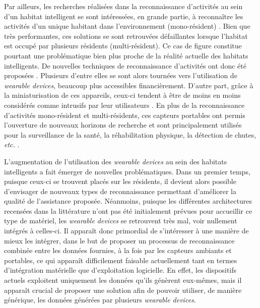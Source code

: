 {{Par ailleurs, les recherches réalisées dans la reconnaissance d'activités au sein d'un habitat intelligent se sont intéressées, en grande partie, à reconnaître les activités d'un unique habitant dans l'environnement (mono-résident) \cite{VikramadityaJakkula2007, VanKasteren2008, Inomata2009, Ghazvininejad2011, Belley2014, Fortin-Simard2015}. Bien que très performantes, ces solutions se sont retrouvées défaillantes lorsque l'habitat est occupé par plusieurs résidents (multi-résident). Ce cas de figure constitue pourtant une problématique bien plus proche de la réalité actuelle des habitats intelligents. De nouvelles techniques de reconnaissance d'activités ont donc été proposées \citep{Crandall2009, Cook2009, Alemdar2013, Ayuningtyas2014, Emi2015, Mokhtari2018}. Plusieurs d'entre elles \citep{Mihailidis2004, Tunca2014} se sont alors tournées vers l'utilisation de \textit{wearable devices}, beaucoup plus accessibles financièrement. D'autre part, grâce à la miniaturisation de ces appareils, ceux-ci tendent à être de moins en moins considérés comme intrusifs par leur utilisateurs \citep{Gaskin2017}. En plus de la reconnaissance d'activités mono-résident et multi-résidents, ces capteurs portables ont permis l'ouverture de nouveaux horizons de recherche et sont principalement utilisés pour la surveillance de la santé, la réhabilitation physique, la détection de chutes, \textit{etc.} \citep{Patel2012, Mukhopadhyay2014, Delahoz2014}.

L'augmentation de l'utilisation des \textit{wearable devices} au sein des habitats intelligents a fait émerger de nouvelles problématiques. Dans un premier temps, puisque ceux-ci se trouvent placés sur les résidents, il devient alors possible d'envisager de nouveaux types de reconnaissance permettant d'améliorer la qualité de l'assistance proposée. Néanmoins, puisque les différentes architectures recensées dans la littérature n'ont pas été initialement prévues pour accueillir ce type de matériel, les \textit{wearable devices} se retrouvent très mal, voir nullement intégrés à celles-ci. Il apparaît donc primordial de s'intéresser à une manière de mieux les intégrer, dans le but de proposer un processus de reconnaissance combinée entre les données fournies, à la fois par les capteurs ambiants et portables, ce qui apparaît difficilement faisable actuellement tant en termes d'intégration matérielle que d'exploitation logicielle. En effet, les dispositifs actuels exploitent uniquement les données qu'ils génèrent eux-mêmes, mais il apparaît crucial de proposer une solution afin de pouvoir utiliser, de manière générique, les données générées par plusieurs \textit{wearable devices}.

}}
